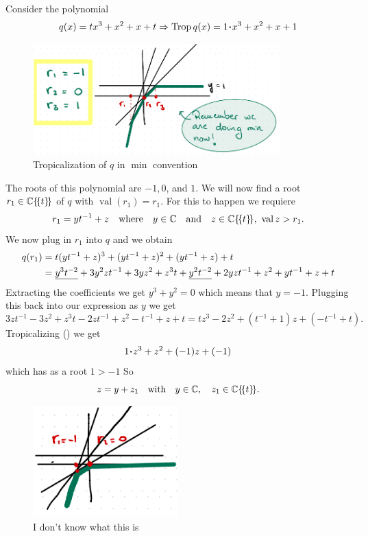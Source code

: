 \documentclass[12pt]{memoir}
\DeclareMathOperator{\val}{val}
\DeclareMathOperator{\Trop}{Trop}
\begin{document}
\begin{Ex}
    Consider the polynomial 
    $$q(x)=tx^3+x^2+x+t\To\Trop q(x)=1\.x^3+x^2+x+1$$
    \begin{figure}[h!]
        \centering
        \includegraphics[width=0.85\textwidth]{figs/fig5-1RealizabilityExampleProof.png}
        \caption{Tropicalization of $q$ in $\min$ convention}
        \label{fig:5.1-RealizabilityExampleProof}
    \end{figure}
    The roots of this polynomial are $-1,0$, and $1$. We will now find a root $r_1\in\mathbb{C}\{\!\{t\}\!\}$ of $q$ with $\val(r_1)=r_1$. For this to happen we requiere 
    $$r_1=yt^{-1}+z\word{where}y\in\bC\word{and}z\in\bC\{\!\{t\}\!\},\ \val z>r_1.$$
    We now plug in $r_1$ into $q$ and we obtain
    \begin{align*}
        q(r_1)&=t(yt^{-1}+z)^3+(yt^{-1}+z)^2+(yt^{-1}+z)+t\\
        &=\underline{y^3t^{-2}}+3y^2zt^{-1}+3yz^2+z^3t+\underline{y^2t^{-2}}+2yzt^{-1}+z^2+yt^{-1}+z+t
    \end{align*}
    Extracting the coefficients we get $y^3+y^2=0$ which means that $y=-1$. Plugging this back into our expression as $y$ we get 
    $$3zt^{-1}-3z^2+z^3t-2zt^{-1}+z^2-t^{-1}+z+t=tz^3-2z^2+(t^{-1}+1)z+(-t^{-1}+t).$$
    Tropicalizing () we get 
    $$1\.z^3+z^2+(-1)z+(-1)$$
    which has as a root $1>-1$ So 
    $$z=y+z_1\quad\text{with}\quad y\in\mathbb{C},\quad z_1\in\mathbb{C}\{\!\{t\}\!\}.$$  
    \begin{figure}[h!]
        \centering
        \includegraphics[width=0.5\textwidth]{figs/fig5-2EndOfProofFiniteCase.png}
        \caption{I don't know what this is}
        \label{fig:5.2-EndOfProofFiniteCase}
    \end{figure}
\end{Ex} 
\end{document}
